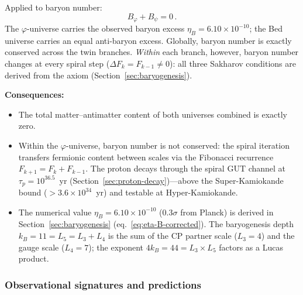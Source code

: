 \documentclass[12pt,a4paper]{article}
\newcommand{\bed}{Bed universe}
\begin{document}
Applied to baryon number:
\begin{equation}
\boxed{B_\varphi + B_\psi = 0\,.}
\end{equation}
The $\varphi$-universe carries the observed baryon excess $\eta_B = 6.10 \times 10^{-10}$; the \bed{} carries an equal anti-baryon excess.  Globally, baryon number is exactly conserved across the twin branches.  \emph{Within} each branch, however, baryon number changes at every spiral step ($\Delta F_k = F_{k-1} \neq 0$): all three Sakharov conditions are derived from the axiom (Section~\ref{sec:baryogenesis}).

\textbf{Consequences:}
\begin{itemize}
\item The total matter--antimatter content of both universes combined is exactly zero.
\item Within the $\varphi$-universe, baryon number is not conserved: the spiral iteration transfers fermionic content between scales via the Fibonacci recurrence $F_{k+1} = F_k + F_{k-1}$.  The proton decays through the spiral GUT channel at $\tau_p = 10^{36.5}$~yr (Section~\ref{sec:proton-decay})---above the Super-Kamiokande bound ($> 3.6 \times 10^{34}$~yr) and testable at Hyper-Kamiokande.
\item The numerical value $\eta_B = 6.10 \times 10^{-10}$ ($0.3\sigma$ from Planck) is derived in Section~\ref{sec:baryogenesis} (eq.~\ref{eq:eta-B-corrected}).  The baryogenesis depth $k_B = 11 = L_5 = L_3 + L_4$ is the sum of the CP partner scale ($L_3 = 4$) and the gauge scale ($L_4 = 7$); the exponent $4k_B = 44 = L_3 \times L_5$ factors as a Lucas product.
\end{itemize}

\subsubsection{Observational signatures and predictions}
\label{sec:psi-observables}
\end{document}
